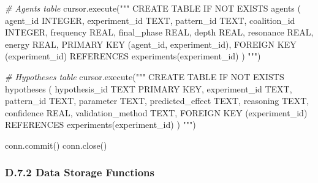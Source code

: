 \documentclass[
]{article}
\newenvironment{Shaded}{}{}
\newcommand{\CommentTok}[1]{\textcolor[rgb]{0.38,0.63,0.69}{\textit{#1}}}
\newcommand{\NormalTok}[1]{#1}
\newcommand{\StringTok}[1]{\textcolor[rgb]{0.25,0.44,0.63}{#1}}
\begin{document}
\begin{Shaded}
\begin{Highlighting}[]
    \CommentTok{\# Agents table}
\NormalTok{    cursor.execute(}\StringTok{"""}
\StringTok{        CREATE TABLE IF NOT EXISTS agents (}
\StringTok{            agent\_id INTEGER,}
\StringTok{            experiment\_id TEXT,}
\StringTok{            pattern\_id TEXT,}
\StringTok{            coalition\_id INTEGER,}
\StringTok{            frequency REAL,}
\StringTok{            final\_phase REAL,}
\StringTok{            depth REAL,}
\StringTok{            resonance REAL,}
\StringTok{            energy REAL,}
\StringTok{            PRIMARY KEY (agent\_id, experiment\_id),}
\StringTok{            FOREIGN KEY (experiment\_id) REFERENCES experiments(experiment\_id)}
\StringTok{        )}
\StringTok{    """}\NormalTok{)}

    \CommentTok{\# Hypotheses table}
\NormalTok{    cursor.execute(}\StringTok{"""}
\StringTok{        CREATE TABLE IF NOT EXISTS hypotheses (}
\StringTok{            hypothesis\_id TEXT PRIMARY KEY,}
\StringTok{            experiment\_id TEXT,}
\StringTok{            pattern\_id TEXT,}
\StringTok{            parameter TEXT,}
\StringTok{            predicted\_effect TEXT,}
\StringTok{            reasoning TEXT,}
\StringTok{            confidence REAL,}
\StringTok{            validation\_method TEXT,}
\StringTok{            FOREIGN KEY (experiment\_id) REFERENCES experiments(experiment\_id)}
\StringTok{        )}
\StringTok{    """}\NormalTok{)}

\NormalTok{    conn.commit()}
\NormalTok{    conn.close()}
\end{Highlighting}
\end{Shaded}

\subsubsection{D.7.2 Data Storage
Functions}\label{d.7.2-data-storage-functions}
\end{document}
